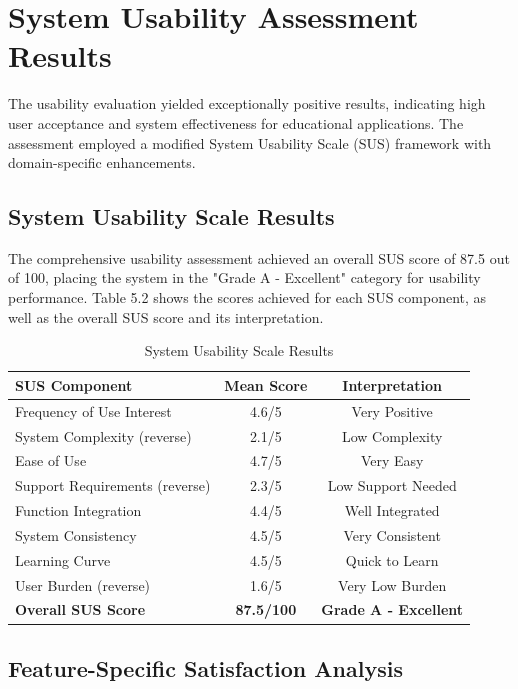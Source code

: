 {\color{maroon}
\section{System Usability Assessment Results}

The usability evaluation yielded exceptionally positive results, indicating high user acceptance and system effectiveness for educational applications. The assessment employed a modified System Usability Scale (SUS) framework with domain-specific enhancements.

\subsection{System Usability Scale Results}

The comprehensive usability assessment achieved an overall SUS score of 87.5 out of 100, placing the system in the "Grade A - Excellent" category for usability performance. Table 5.2 shows the scores achieved for each SUS component, as well as the overall SUS score and its interpretation.



\begin{table}[!htbp]
\centering
\caption[System Usability Scale Results]{System Usability Scale Results}
\label{tab:sus_components}
\begin{tabular}{lcc}
\toprule
\textbf{SUS Component} & \textbf{Mean Score} & \textbf{Interpretation} \\
\midrule
Frequency of Use Interest & 4.6/5 & Very Positive \\
System Complexity (reverse) & 2.1/5 & Low Complexity \\
Ease of Use & 4.7/5 & Very Easy \\
Support Requirements (reverse) & 2.3/5 & Low Support Needed \\
Function Integration & 4.4/5 & Well Integrated \\
System Consistency & 4.5/5 & Very Consistent \\
Learning Curve & 4.5/5 & Quick to Learn \\
User Burden (reverse) & 1.6/5 & Very Low Burden \\
\midrule
\textbf{Overall SUS Score} & \textbf{87.5/100} & \textbf{Grade A - Excellent} \\
\bottomrule
\end{tabular}
\end{table}
\FloatBarrier

\subsection{Feature-Specific Satisfaction Analysis}

}
